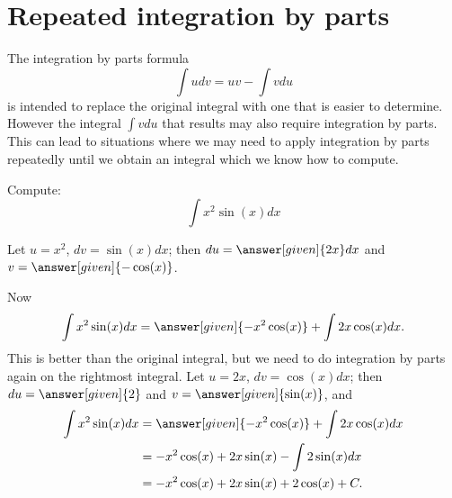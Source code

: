 \documentclass[noauthor]{ximera}
\begin{document}
\section{Repeated integration by parts}

The  integration by parts formula
 \[
\int u dv= uv - \int v du
\]
 is intended to replace the original integral with one that is easier to determine. However the integral $\int v du$ that results may also require integration by parts. This can lead to situations where we may need to apply integration by parts repeatedly until we obtain an integral which we know how to compute. 


%

\begin{example}
Compute:
\[
\int x^2\sin(x)dx
\] 
\begin{explanation}
Let $u=x^2$, $dv=\sin(x)dx$; then $du=\answer[given]{2x}dx$ and $v=\answer[given]{-\cos(x)}$. 

Now 
\[
\int x^2\sin(x)dx=\answer[given]{-x^2\cos(x)}+\int 2x\cos(x)dx.
\] 
This is better than the original integral, but we need to do
integration by parts again on the rightmost integral. Let $u=2x$, $dv=\cos(x)dx$; then $du=\answer[given]{2}$
and $v=\answer[given]{\sin(x)}$, and
\begin{align*}
  \int x^2\sin(x)dx &=\answer[given]{-x^2\cos(x)}+\int 2x\cos(x)dx \\
  &=-x^2\cos(x)+ 2x\sin(x) - \int 2\sin(x)dx \\
  &=-x^2\cos(x)+ 2x\sin(x) + 2\cos(x) + C. 
\end{align*}
\end{explanation}
\end{example}
\end{document}
